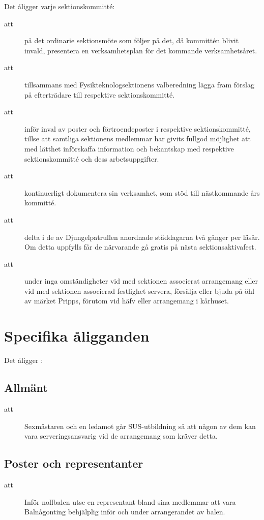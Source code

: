 Det åligger varje sektionskommitté:
\begin{description}
    \item[att] på det ordinarie sektionsmöte som följer på det, då kommittén blivit invald, presentera en verksamhetsplan för det kommande verksamhetsåret.
      \item[att] tillsammans med Fysikteknologsektionens valberedning lägga fram förslag på efterträdare till respektive sektionskommitté.
      \item[att] inför inval av poster och förtroendeposter i respektive sektionskommitté, tillse att samtliga sektionens medlemmar har givits fullgod möjlighet att med lätthet införskaffa information och bekantskap med respektive sektionskommitté och dess arbetsuppgifter.
      \item[att] kontinuerligt dokumentera sin verksamhet, som stöd till näst\-komm\-ande års kommitté.
      \item[att] delta i de av Djungelpatrullen anordnade städdagarna två gånger per
      läsår. Om detta uppfylls får de närvarande gå gratis på nästa
      sektionsaktivafest.
      \item[att] under inga omständigheter vid med sektionen associerat arrangemang eller vid med sektionen associerad festlighet servera, försälja eller bjuda på öhl av märket Pripps, förutom vid häfv eller arrangemang i kårhuset.
      
    \end{description}


\section{Specifika åligganden}
Det åligger \forening:

\subsection{Allmänt}
\begin{description}
\item[att] Sexmästaren och en ledamot går SUS-utbildning så att någon av dem kan vara serveringsansvarig vid de arrangemang som kräver detta.

\end{description}

\subsection{Poster och representanter}
\begin{description}
\item[att] Inför nollbalen utse en representant bland sina medlemmar att vara Balnågonting behjälplig inför och under arrangerandet av balen.
\end{description}


